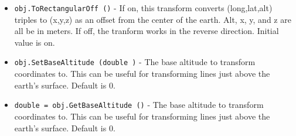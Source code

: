 \begin{itemize}
\item  \verb|obj.ToRectangularOff ()| -  If on, this transform converts (long,lat,alt) triples to (x,y,z) as an offset
 from the center of the earth. Alt, x, y, and z are all be in meters.
 If off, the tranform works in the reverse direction.
 Initial value is on.

\item  \verb|obj.SetBaseAltitude (double )| -  The base altitude to transform coordinates to. This can be useful for transforming
 lines just above the earth's surface. Default is 0.

\item  \verb|double = obj.GetBaseAltitude ()| -  The base altitude to transform coordinates to. This can be useful for transforming
 lines just above the earth's surface. Default is 0.

\end{itemize}
